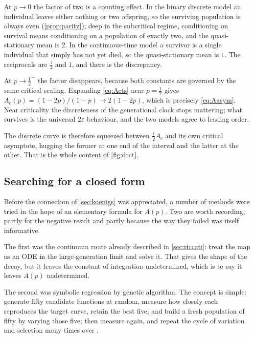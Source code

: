 At $p\to0$ the factor of two is a counting effect. In the binary discrete model an
individual leaves either nothing or two offspring, so the surviving population is always
even (\cref{prop:parity}); deep in the subcritical regime, conditioning on survival means
conditioning on a population of exactly two, and the quasi-stationary mean is $2$. In the
continuous-time model a survivor is a single individual that simply has not yet died, so
the quasi-stationary mean is $1$. The reciprocals are $\tfrac12$ and $1$, and there is the
discrepancy.

At $p\to\tfrac12^-$ the factor disappears, because both constants are governed by the same
critical scaling. Expanding \cref{eq:Acts} near $p=\tfrac12$ gives
$A_{\text{c}}(p) = (1-2p)/(1-p)\to2(1-2p)$, which is precisely \cref{eq:Aasym}. Near
criticality the discreteness of the generational clock stops mattering; what survives is
the universal $2\varepsilon$ behaviour, and the two models agree to leading order.

The discrete curve is therefore squeezed between $\tfrac12A_{\text{c}}$ and its own
critical asymptote, hugging the former at one end of the interval and the latter at the
other. That is the whole content of \cref{fig:dtct}.

\subsection{Searching for a closed form}
\label{sec:GA}

Before the connection of \cref{sec:koenigs} was appreciated, a number of methods were
tried in the hope of an elementary formula for $A(p)$. Two are worth recording, partly for
the negative result and partly because the way they failed was itself informative.

The first was the continuum route already described in \cref{sec:riccati}: treat the map
as an ODE in the large-generation limit and solve it. That gives the shape of the decay,
but it leaves the constant of integration undetermined, which is to say it leaves $A(p)$
undetermined.

The second was symbolic regression by genetic algorithm. The concept is simple: generate
fifty candidate functions at random, measure how closely each reproduces the target curve,
retain the best five, and build a fresh population of fifty by varying those five; then
measure again, and repeat the cycle of variation and selection many times over
\cite{stanley2002evolving,cohen2024physics}.

